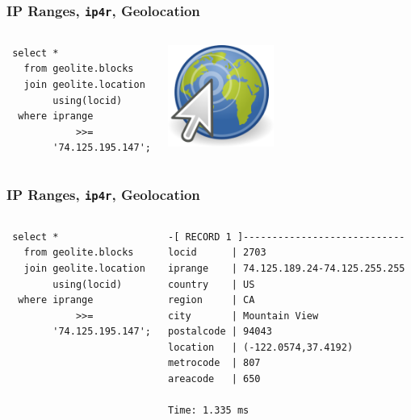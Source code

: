 \documentclass{beamer}
\begin{document}
\begin{frame}[fragile]
  \frametitle{IP Ranges, \texttt{ip4r}, Geolocation}

  \vfill

\begin{columns}
\begin{verbatim}
 select *
   from geolite.blocks
   join geolite.location
        using(locid)
  where iprange
            >>=
        '74.125.195.147';
\end{verbatim}
\begin{center}
  \includegraphics[height=9em]{geolocation-clic.png}
\end{center}
\end{columns}
\end{frame}

\begin{frame}[fragile]
  \frametitle{IP Ranges, \texttt{ip4r}, Geolocation}

  \vfill

\begin{columns}
\begin{verbatim}
 select *
   from geolite.blocks
   join geolite.location
        using(locid)
  where iprange
            >>=
        '74.125.195.147';
\end{verbatim}
\begin{verbatim}
-[ RECORD 1 ]----------------------------
locid      | 2703
iprange    | 74.125.189.24-74.125.255.255
country    | US
region     | CA
city       | Mountain View
postalcode | 94043
location   | (-122.0574,37.4192)
metrocode  | 807
areacode   | 650

Time: 1.335 ms
\end{verbatim}
\end{columns}
\end{frame}
\end{document}
